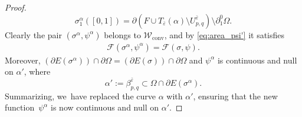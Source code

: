 \documentclass[JEP,XML,SOM,Unicode, NoFloatCountersInSection,published]{cedram}
\let\eps\varepsilon
\let\Om\Omega
\newcommand\admclassconv{{\mathcal W_\mathrm{conv}}}
\theoremstyle{definition}
\begin{document}
\begin{proof}
\begin{equation*}
\sigma^\alpha_{1}([0,1])= \partial (F\cup T_{\bar\eps}(\alpha)\setminus U^{\bar{\eps}}_{p,q})\setminus\partial_1^0\Om.
\end{equation*}
Clearly the pair $(\sigma^\alpha,\psi^\alpha)$ belongs to $\admclassconv$, and by \eqref{eq:area_psi'} it satisfies
\begin{equation*}
\begin{split}
{\mathcal F}(\sigma^\alpha,\psi^\alpha)=
{\mathcal F}(\sigma, \psi).
\end{split}
\end{equation*}
Moreover,
$
(\partial E(\sigma^\alpha))\cap\partial\Om=(\partial E(\sigma))\cap\partial\Om$ and $\psi^\alpha$ is continuous and null on $\alpha'$, where
\begin{equation}\label{gamma'}
\alpha':=\beta_{p,q}^{\bar\eps}\subset \Om\cap\partial E(\sigma^\alpha).
\end{equation}
Summarizing, we~have replaced the curve $\alpha$ with $\alpha'$, ensuring that the new function~$\psi^\alpha$ is now continuous and null on $\alpha'$.


\end{proof}
\end{document}
